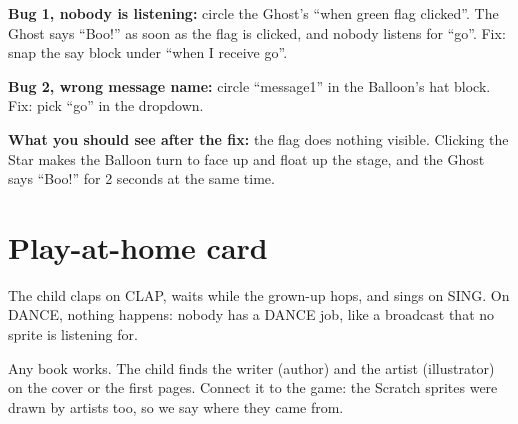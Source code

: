 \begin{answer}
\textbf{Bug 1, nobody is listening:} circle the Ghost's \enquote{when green flag clicked}. The Ghost says \enquote{Boo!} as soon as the flag is clicked, and nobody listens for \enquote{go}. Fix: snap the say block under \enquote{when I receive go}.

\textbf{Bug 2, wrong message name:} circle \enquote{message1} in the Balloon's hat block. Fix: pick \enquote{go} in the dropdown.

\textbf{What you should see after the fix:} the flag does nothing visible. Clicking the Star makes the Balloon turn to face up and float up the stage, and the Ghost says \enquote{Boo!} for 2 seconds at the same time.
\end{answer}

\section{Play-at-home card}
\begin{answer}
The child claps on CLAP, waits while the grown-up hops, and sings on SING. On DANCE, nothing happens: nobody has a DANCE job, like a broadcast that no sprite is listening for.
\end{answer}

\begin{answer}
Any book works. The child finds the writer (author) and the artist (illustrator) on the cover or the first pages. Connect it to the game: the Scratch sprites were drawn by artists too, so we say where they came from.
\end{answer}
